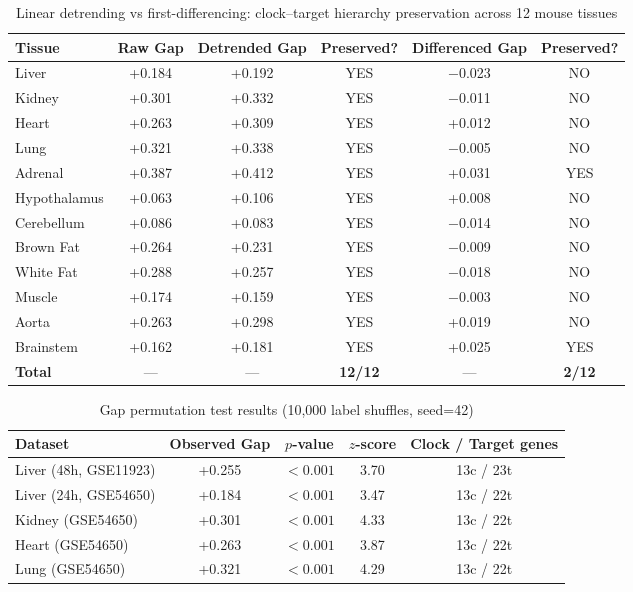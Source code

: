 \documentclass[11pt,a4paper]{article}
\begin{document}
\begin{table}[H]
\centering
\caption{Linear detrending vs first-differencing: clock--target hierarchy preservation across 12 mouse tissues}
\label{tab:detrend}
\begin{tabular}{lccccc}
\toprule
Tissue & Raw Gap & Detrended Gap & Preserved? & Differenced Gap & Preserved? \\
\midrule
Liver & +0.184 & +0.192 & YES & $-$0.023 & NO \\
Kidney & +0.301 & +0.332 & YES & $-$0.011 & NO \\
Heart & +0.263 & +0.309 & YES & +0.012 & NO \\
Lung & +0.321 & +0.338 & YES & $-$0.005 & NO \\
Adrenal & +0.387 & +0.412 & YES & +0.031 & YES \\
Hypothalamus & +0.063 & +0.106 & YES & +0.008 & NO \\
Cerebellum & +0.086 & +0.083 & YES & $-$0.014 & NO \\
Brown Fat & +0.264 & +0.231 & YES & $-$0.009 & NO \\
White Fat & +0.288 & +0.257 & YES & $-$0.018 & NO \\
Muscle & +0.174 & +0.159 & YES & $-$0.003 & NO \\
Aorta & +0.263 & +0.298 & YES & +0.019 & NO \\
Brainstem & +0.162 & +0.181 & YES & +0.025 & YES \\
\midrule
\textbf{Total} & --- & --- & \textbf{12/12} & --- & \textbf{2/12} \\
\bottomrule
\end{tabular}
\end{table}

\begin{table}[H]
\centering
\caption{Gap permutation test results (10,000 label shuffles, seed=42)}
\label{tab:permgap}
\begin{tabular}{lcccc}
\toprule
Dataset & Observed Gap & $p$-value & $z$-score & Clock / Target genes \\
\midrule
Liver (48h, GSE11923) & +0.255 & $<0.001$ & 3.70 & 13c / 23t \\
Liver (24h, GSE54650) & +0.184 & $<0.001$ & 3.47 & 13c / 22t \\
Kidney (GSE54650) & +0.301 & $<0.001$ & 4.33 & 13c / 22t \\
Heart (GSE54650) & +0.263 & $<0.001$ & 3.87 & 13c / 22t \\
Lung (GSE54650) & +0.321 & $<0.001$ & 4.29 & 13c / 22t \\
\bottomrule
\end{tabular}
\end{table}
\end{document}
